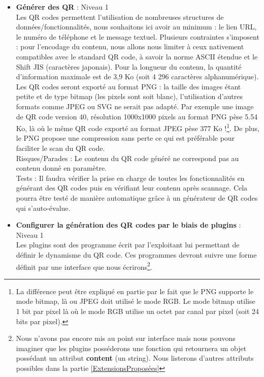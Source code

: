 \documentclass[a4paper,12pt]{article}
\begin{document}
\begin{itemize}

  \item \textbf{Générer des QR} : Niveau 1\\
  \label{GenQRCode}
  Les QR codes permettent l'utilisation de nombreuses structures de données/fonctionnalités, nous souhaitons ici avoir au minimum : le lien URL, le numéro de téléphone et le message textuel. Plusieurs contraintes s'imposent : pour l'encodage du contenu, nous allons nous limiter à ceux nativement compatibles avec le standard QR code, à savoir la norme ASCII étendue et le Shift JIS (caractères japonais). Pour la longueur du contenu, la quantité d'information maximale est de 3,9 Ko (soit 4 296 caractères alphanumérique).\\
  
  Les QR codes seront exporté au format PNG : la taille des images étant petite et de type bitmap (les pixels sont soit blanc), l'utilisation d'autres formats comme JPEG ou SVG ne serait pas adapté. Par exemple une image de QR code version 40, résolution 1000x1000 pixels au format PNG pèse 5.54 Ko, là où le même QR code exporté au format JPEG pèse 377 Ko !\footnote{La différence peut être expliqué en partie par le fait que le PNG supporte le mode bitmap, là ou JPEG doit utilisé le mode RGB. Le mode bitmap utilise 1 bit par pixel là où le mode RGB utilise un octet par canal par pixel (soit 24 bits par pixel).}. De plus, le PNG propose une compression sans perte ce qui est préférable pour faciliter le scan du QR code.\\
  
  Risques/Parades : Le contenu du QR code généré ne correspond pas au contenu donné en paramètre.\\
  Tests : Il faudra vérifier la prise en charge de toutes les fonctionnalités en générant des QR codes puis en vérifiant leur contenu après scannage. Cela pourra être testé de manière automatique grâce à un générateur de QR codes qui s'auto-évalue.\\

  \item \textbf{Configurer la génération des QR codes par le biais de plugins} : Niveau 1\\
  Les plugins sont des programme écrit par l'exploitant lui permettant de définir le dynamisme du QR code. Ces programmes devront suivre une forme définit par une interface que nous écrirons\footnote{Nous n'avons pas encore mis au point sur interface mais nous pouvons imaginer que les plugins posséderons une fonction qui retournera un objet possédant un attribut \textbf{content} (un string). Nous listerons d'autres attributs possibles dans la partie \ref{ExtensionsProposées}}.\\
  
\end{itemize}
\end{document}

